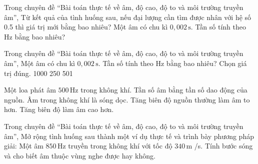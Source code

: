 \begin{ex}
Trong chuyên đề “Bài toán thực tế về âm, độ cao, độ to và môi trường truyền âm”, Từ kết quả của tình huống sau, nếu đại lượng cần tìm được nhân với hệ số 0.5 thì giá trị mới bằng bao nhiêu? Một âm có chu kì $0,002\,\text{s}$. Tần số tính theo Hz bằng bao nhiêu?
\end{ex}

\begin{ex}
Trong chuyên đề “Bài toán thực tế về âm, độ cao, độ to và môi trường truyền âm”, Một âm có chu kì $0,002\,\text{s}$. Tần số tính theo Hz bằng bao nhiêu? Chọn giá trị đúng.
\choice
{1000}
{250}
{501}
{}
\end{ex}

\begin{ex}
Một loa phát âm $500\,\text{Hz}$ trong không khí.
\choiceTF
{\True Tần số âm bằng tần số dao động của nguồn.}
{\True Âm trong không khí là sóng dọc.}
{\True Tăng biên độ nguồn thường làm âm to hơn.}
{Tăng biên độ làm âm cao hơn.}
\end{ex}

\begin{ex}
Trong chuyên đề “Bài toán thực tế về âm, độ cao, độ to và môi trường truyền âm”, Mở rộng tình huống sau thành một ví dụ thực tế và trình bày phương pháp giải: Một âm $850\,\text{Hz}$ truyền trong không khí với tốc độ $340\,\text{m}$ /s. Tính bước sóng và cho biết âm thuộc vùng nghe được hay không.
\choiceTF

\end{ex}

